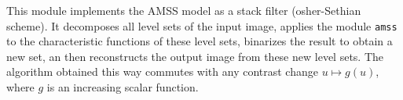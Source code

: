 This module implements the AMSS model as a stack filter (osher-Sethian 
scheme). It decomposes all level sets of the input image,
applies the module \verb+amss+ to the characteristic functions of
these level sets, binarizes the result to obtain a new set, an then
reconstructs the output image from these new level sets. 
The algorithm obtained this way commutes with any contrast change
$u\mapsto g(u)$, where $g$ is an increasing scalar function.